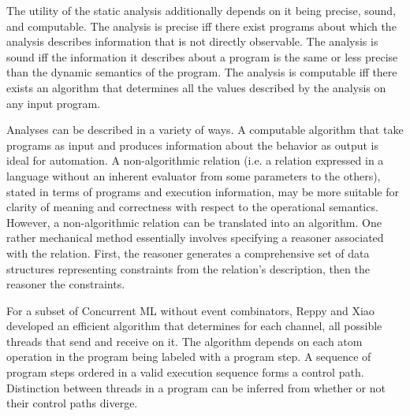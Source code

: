 \documentclass[letterpaper, 11pt]{extarticle}
\begin{document}
The utility of the static analysis additionally depends on it being precise, sound, and
computable. The analysis is precise iff there exist programs about which the analysis
describes information that is not directly observable. The analysis is sound iff the
information it describes about a program is the same or less precise than the dynamic
semantics of the program. The analysis is computable iff there exists an algorithm that
determines all the values described by the analysis on any input program.

Analyses can be described in a variety of ways. A computable algorithm that take programs
as input and produces information about the behavior as output is ideal for automation. A
non-algorithmic relation (i.e. a relation expressed in a language without an inherent evaluator
from some parameters to the others),
stated in terms of programs and execution information, may be
more suitable for clarity of meaning and correctness with respect to the operational
semantics. However, a non-algorithmic relation can be translated into an algorithm.
One rather mechanical method essentially involves
specifying a reasoner associated with the relation. 
First, the reasoner generates a comprehensive set of data structures representing
constraints from the relation's description, then the reasoner the constraints.

For a subset of Concurrent ML without event combinators, Reppy and Xiao developed an
efficient algorithm that determines for each channel, all possible threads that send
and receive on it. The algorithm depends on each atom operation in the program being
labeled with a program step. A sequence of program steps ordered in a valid execution
sequence forms a control path. Distinction between threads in a program can be inferred from
whether or not their control paths diverge.  
\end{document}
